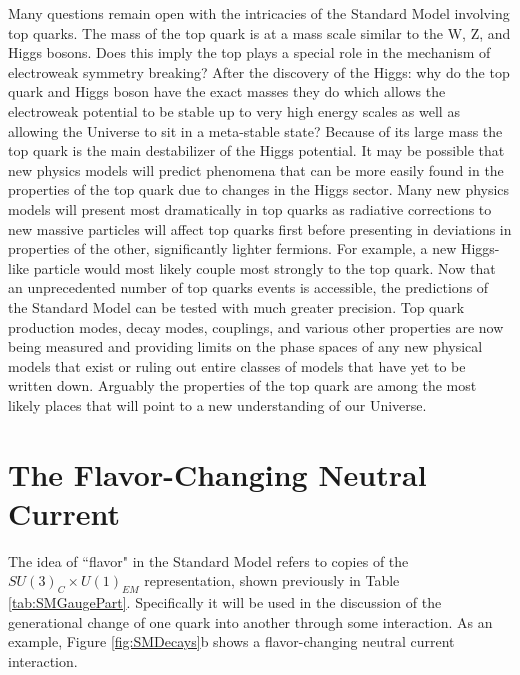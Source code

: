 Many questions remain open with the intricacies of the Standard Model involving top quarks.  The mass of the top quark is at a mass scale similar to the W, Z, and Higgs bosons.  Does this imply the top plays a special role in the mechanism of electroweak symmetry breaking?  After the discovery of the Higgs: why do the top quark and Higgs boson have the exact masses they do which allows the electroweak potential to be stable up to very high energy scales as well as allowing the Universe to sit in a meta-stable state\cite{TopReview}?  Because of its large mass the top quark is the main destabilizer of the Higgs potential.  It may be possible that new physics models will predict phenomena that can be more easily found in the properties of the top quark due to changes in the Higgs sector.  Many new physics models will present most dramatically in top quarks as radiative corrections to new massive particles will affect top quarks first before presenting in deviations in properties of the other, significantly lighter fermions.  For example, a new Higgs-like particle would most likely couple most strongly to the top quark.  
 Now that an unprecedented number of top quarks events is accessible, the predictions of the Standard Model can be tested with much greater precision.  Top quark production modes, decay modes, couplings, and various other properties are now being measured and providing limits on the phase spaces of any new physical models that exist or ruling out entire classes of models that have yet to be written down.  Arguably the properties of the top quark are among the most likely places that will point to a new understanding of our Universe.


\section{The Flavor-Changing Neutral Current}
\label{sec:FCNC}
  The idea of ``flavor" in the Standard Model refers to copies of the $SU(3)_C \times U(1)_{EM}$ representation, shown previously in Table \ref{tab:SMGaugePart}.  Specifically it will be used in the discussion of the generational change of one quark into another through some interaction.  As an example, Figure \ref{fig:SMDecays}b shows a flavor-changing neutral current interaction.
